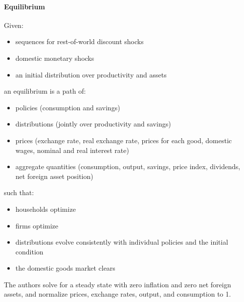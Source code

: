 \documentclass[12pt]{article}
\begin{document}
\paragraph{Equilibrium}
Given:
\begin{itemize}
    \item sequences for rest-of-world discount shocks
    \item domestic monetary shocks
    \item an initial distribution over productivity and assets
\end{itemize}
an equilibrium is a path of:
\begin{itemize}
    \item policies (consumption and savings)
    \item distributions (jointly over productivity and savings)
    \item prices (exchange rate, real exchange rate, prices for each good, domestic wages, nominal and real interest rate)
    \item aggregate quantities (consumption, output, savings, price index, dividends, net foreign asset position)
\end{itemize}
such that:
\begin{itemize}
    \item households optimize
    \item firms optimize
    \item distributions evolve consistently with individual policies and the initial condition
    \item the domestic goods market clears
\end{itemize}
The authors solve for a steady state with zero inflation and zero net foreign assets, and normalize prices, exchange rates, output, and consumption to 1.

\clearpage
\end{document}

